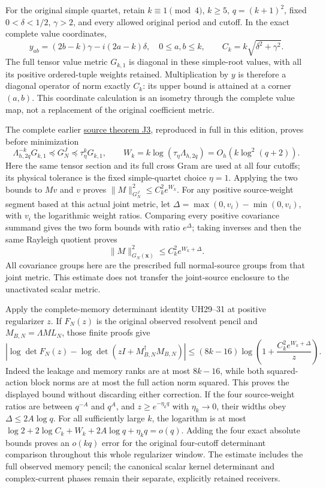 For the original simple quartet, retain \(k\equiv1\pmod4\), \(k\ge5\), \(q=(k+1)^2\), fixed \(0<\delta<1/2\), \(\gamma>2\), and every allowed original period and cutoff. In the exact complete value coordinates, \[
y_{ab}=(2b-k)\gamma-i(2a-k)\delta,\quad 0\le a,b\le k,
\qquad C_k=k\sqrt{\delta^2+\gamma^2}.                     \tag{UFR21}
\] The full tensor value metric \(G_{k,1}\) is diagonal in these simple-root values, with all its positive ordered-tuple weights retained. Multiplication by \(y\) is therefore a diagonal operator of norm exactly \(C_k\): its upper bound is attained at a corner \((a,b)\). This coordinate calculation is an isometry through the complete value map, not a replacement of the original coefficient metric.

The complete earlier \href{https://github.com/KokunoYumeto/zeta-function-research-reader/blob/main/workbenches/splitzero-tandem/continuations/20260921-uniform-source-family/JOINT_MINIMUM_COMPLETE.tex\#L634}{source theorem J3}, reproduced in full in this edition, proves before minimization \[
\Lambda_{h,2q}^{-k}G_{k,1}\preceq G_N^J
\preceq\tau_\eta^kG_{k,1},\qquad
W_k=k\log(\tau_\eta\Lambda_{h,2q})=O_h(k\log^2(q+2)).
\] Here the same tensor section and its full cross Gram are used at all four cutoffs; its physical tolerance is the fixed simple-quartet choice \(\eta=1\). Applying the two bounds to \(Mv\) and \(v\) proves \(\|M\|_{G_N^J}^2\le C_k^2 e^{W_k}\). For any positive source-weight segment based at this actual joint metric, let \(\Delta=\max(0,v_i)-\min(0,v_i)\), with \(v_i\) the logarithmic weight ratios. Comparing every positive covariance summand gives the two form bounds with ratio \(e^\Delta\); taking inverses and then the same Rayleigh quotient proves \[
\|M\|_{G_N(\mathbf x)}^2\le C_k^2e^{W_k+\Delta}.
                                                               \tag{UFR22}
\] All covariance groups here are the prescribed full normal-source groups from that joint metric. This estimate does not transfer the joint-source enclosure to the unactivated scalar metric.

Apply the complete-memory determinant identity UH29--31 at positive regularizer \(z\). If \(F_N(z)\) is the original observed resolvent pencil and \(M_{B,N}=\Lambda ML_N\), those finite proofs give \[
\left|\log\det F_N(z)-\log\det(zI+M_{B,N}^{\dagger}M_{B,N})\right|
\le (8k-16)\log\left(1+\frac{C_k^2e^{W_k+\Delta}}{z}\right).
                                                               \tag{UFR23}
\] Indeed the leakage and memory ranks are at most \(8k-16\), while both squared-action block norms are at most the full action norm squared. This proves the displayed bound without discarding either correction. If the four source-weight ratios are between \(q^{-A}\) and \(q^A\), and \(z\ge e^{-\eta_k q}\) with \(\eta_k\to0\), their widths obey \(\Delta\le2A\log q\). For all sufficiently large \(k\), the logarithm is at most \(\log2+2\log C_k+W_k+2A\log q+\eta_k q=o(q)\). Adding the four exact absolute bounds proves an \(o(kq)\) error for the original four-cutoff determinant comparison throughout this whole regularizer window. The estimate includes the full observed memory pencil; the canonical scalar kernel determinant and complex-current phases remain their separate, explicitly retained receivers.

